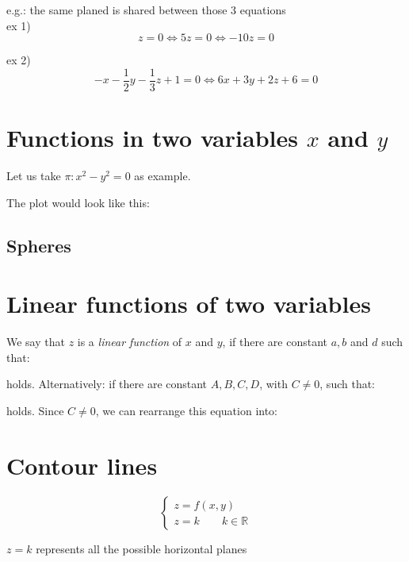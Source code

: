 \documentclass{article}
\begin{document}
e.g.: the same planed is shared between those 3 equations\\
ex 1)
\[z=0 \Longleftrightarrow 5z=0 \Longleftrightarrow -10z=0\]

ex 2)
\[-x-\frac{1}{2}y-\frac{1}{3}z + 1 = 0 \Longleftrightarrow 6x+3y+2z+6=0\]


\newpage
\section{Functions in two variables $x$ and $y$}
Let us take $\pi:x^2-y^2=0$ as example.

The plot would look like this:

\begin{center}
\end{center}

\subsection{Spheres}

\section{Linear functions of two variables}
We say that $z$ is a \textit{linear function} of $x$ and $y$, if there are
constant $a,b$ and $d$ such that:

holds. Alternatively: if there are constant $A,B,C,D$, with $C \neq 0$, such that:

holds. Since $C \neq 0$, we can rearrange this equation into:

\newpage
\section{Contour lines}
\[
\begin{cases}
    z = f(x,y)\\
    z = k \qquad k\in\mathbb{R}
\end{cases}
\]

$z=k$ represents all the possible horizontal planes
\end{document}
